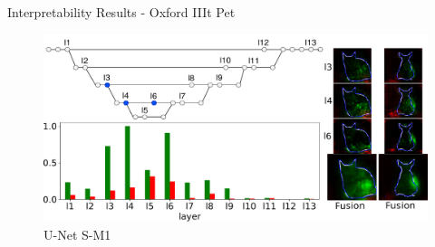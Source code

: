 \documentclass[aspectratio=169]{beamer}
\begin{document}
\begin{frame}[allowframebreaks]{Interpretability Results - Oxford IIIt Pet}
\framebreak
\begin{figure}[htbp]
  \centering
  \includegraphics[width=0.75\linewidth]{Figures/oxford_unet_best.pdf}
  \caption{U-Net S-M1}
\end{figure}


\end{frame}
\end{document}
